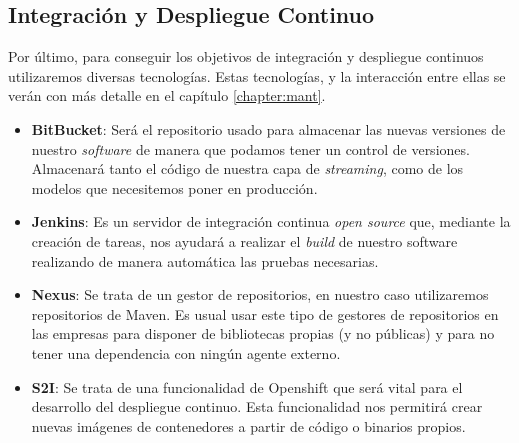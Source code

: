 \subsection{Integración y Despliegue Continuo}

Por último, para conseguir los objetivos de integración y despliegue continuos utilizaremos diversas  tecnologías. Estas tecnologías, y la interacción entre ellas se verán con más detalle en el capítulo \ref{chapter:mant}.

\begin{itemize}
	\item \textbf{BitBucket}: Será el repositorio usado para almacenar las nuevas versiones de nuestro \textit{software} de manera que podamos tener un control de versiones. Almacenará tanto el código de nuestra capa de \textit{streaming}, como de los modelos que necesitemos poner en producción. 
	\item \textbf{Jenkins}: Es un servidor de integración continua \textit{open source}  que, mediante la creación de tareas, nos ayudará a realizar el \textit{build} de nuestro software realizando de manera automática las pruebas necesarias.
	\item \textbf{Nexus}: Se trata de un gestor de repositorios, en nuestro caso utilizaremos repositorios de Maven. Es usual usar este tipo de gestores de repositorios en las empresas para disponer de bibliotecas propias (y no públicas) y para no tener una dependencia con ningún agente externo.
	\item \textbf{S2I}: Se trata de una funcionalidad de Openshift que será vital para el desarrollo del despliegue continuo. Esta funcionalidad nos permitirá crear nuevas imágenes de contenedores a partir de código o binarios propios.
\end{itemize}










